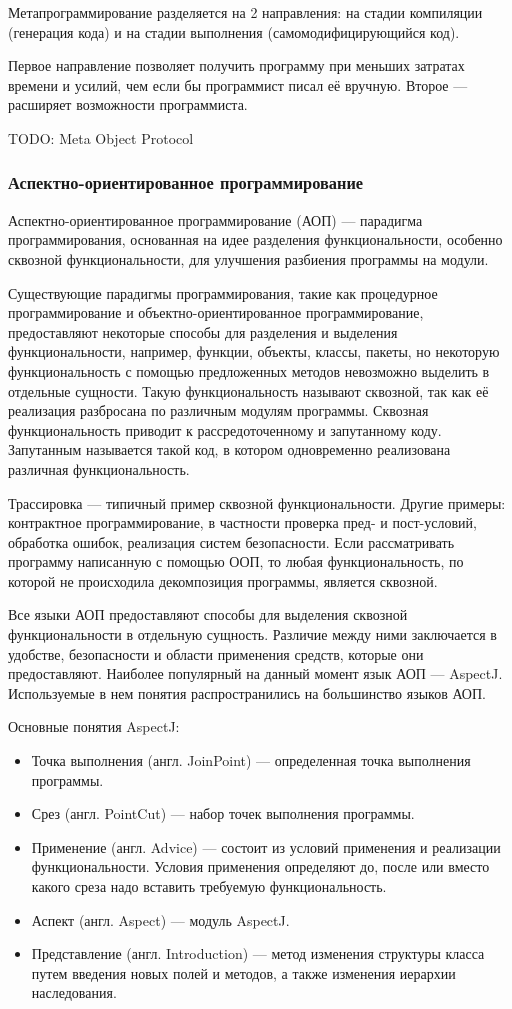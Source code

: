 \documentclass[a4paper,12pt]{article}
\begin{document}
Метапрограммирование разделяется на 2 направления: на стадии
компиляции (генерация кода) и на стадии выполнения (самомодифицирующийся код).

Первое направление позволяет получить программу при меньших затратах времени и
усилий, чем если бы программист писал её вручную. Второе — расширяет
возможности программиста.

TODO: Meta Object Protocol

\subsubsection{Аспектно-ориентированное программирование}
Аспектно-ориентированное программирование (АОП) — парадигма программирования,
основанная на идее разделения функциональности, особенно сквозной
функциональности, для улучшения разбиения программы на модули.

Существующие парадигмы программирования, такие как процедурное программирование
и объектно-ориентированное программирование, предоставляют некоторые способы
для разделения и выделения функциональности, например, функции, объекты,
классы, пакеты, но некоторую функциональность с помощью предложенных методов
невозможно выделить в отдельные сущности. Такую функциональность называют
сквозной, так как её реализация разбросана по различным модулям программы.
Сквозная функциональность приводит к рассредоточенному и запутанному коду.
Запутанным называется такой код, в котором одновременно реализована различная
функциональность.

Трассировка — типичный пример сквозной функциональности. Другие примеры:
контрактное программирование, в частности проверка пред- и пост-условий,
обработка ошибок, реализация систем безопасности. Если рассматривать программу
написанную с помощью ООП, то любая функциональность, по которой не происходила
декомпозиция программы, является сквозной.

Все языки АОП предоставляют способы для выделения сквозной функциональности в
отдельную сущность. Различие между ними заключается в удобстве, безопасности и
области применения средств, которые они предоставляют. Наиболее популярный на
данный момент язык АОП — AspectJ. Используемые в нем понятия распространились
на большинство языков АОП.

Основные понятия AspectJ:
\begin{itemize}
 \item Точка выполнения (англ. JoinPoint) — определенная точка выполнения программы.
 \item Срез (англ. PointCut) — набор точек выполнения программы.
 \item Применение (англ. Advice) — состоит из условий применения и реализации
 функциональности. Условия применения определяют до, после или вместо какого
 среза надо вставить требуемую функциональность.  
 \item Аспект (англ. Aspect) — модуль AspectJ.
 \item Представление (англ. Introduction) — метод изменения структуры класса
 путем введения новых полей и методов, а также изменения иерархии наследования.
\end{itemize}
\end{document}
